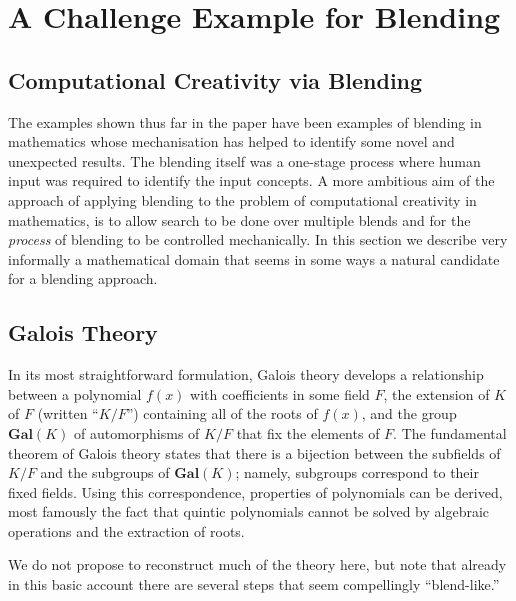 \section{A Challenge Example for Blending} \label{galois}

\subsection{Computational Creativity via Blending}

The examples shown thus far in the paper have been examples of
blending in mathematics whose mechanisation has helped to identify
some novel and unexpected results. The blending itself was a one-stage
process where human input was required to identify the input
concepts. A more ambitious aim of the approach of applying blending to
the problem of computational creativity in mathematics, is to allow
search to be done over multiple blends and for the {\em process} of
blending to be controlled mechanically. In this section we describe
very informally a mathematical domain that seems in
some ways a natural candidate for a blending approach.

\subsection{Galois Theory}


In its most straightforward formulation, Galois theory develops a
relationship between a polynomial $f(x)$ with coefficients in some
field $F$, the extension of $K$ of $F$ (written ``$K/F$'') containing
all of the roots of $f(x)$, and the group $\mathbf{Gal}(K)$ of
automorphisms of $K/F$ that fix the elements of $F$.  The fundamental
theorem of Galois theory states that there is a bijection between the
subfields of $K/F$ and the subgroups of $\mathbf{Gal}(K)$;
namely, subgroups correspond to their fixed fields.  Using this
correspondence, properties of polynomials can be derived, most
famously the fact that quintic polynomials cannot be solved by
algebraic operations and the extraction of roots.  

We do not propose to reconstruct much of the theory here, but note
that already in this basic account there are several steps that seem
compellingly ``blend-like.''

